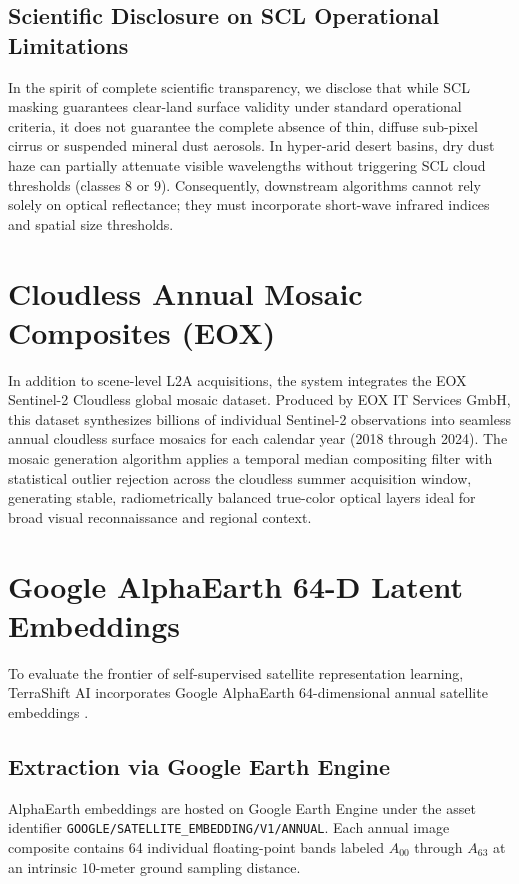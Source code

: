 \subsection{Scientific Disclosure on SCL Operational Limitations}
In the spirit of complete scientific transparency, we disclose that while SCL masking guarantees clear-land surface validity under standard operational criteria, it does not guarantee the complete absence of thin, diffuse sub-pixel cirrus or suspended mineral dust aerosols. In hyper-arid desert basins, dry dust haze can partially attenuate visible wavelengths without triggering SCL cloud thresholds (classes 8 or 9). Consequently, downstream algorithms cannot rely solely on optical reflectance; they must incorporate short-wave infrared indices and spatial size thresholds.

\section{Cloudless Annual Mosaic Composites (EOX)}
\label{sec:data_eox}
In addition to scene-level L2A acquisitions, the system integrates the EOX Sentinel-2 Cloudless global mosaic dataset. Produced by EOX IT Services GmbH, this dataset synthesizes billions of individual Sentinel-2 observations into seamless annual cloudless surface mosaics for each calendar year (2018 through 2024). The mosaic generation algorithm applies a temporal median compositing filter with statistical outlier rejection across the cloudless summer acquisition window, generating stable, radiometrically balanced true-color optical layers ideal for broad visual reconnaissance and regional context.

\section{Google AlphaEarth 64-D Latent Embeddings}
\label{sec:data_alphaearth}
To evaluate the frontier of self-supervised satellite representation learning, TerraShift AI incorporates Google AlphaEarth 64-dimensional annual satellite embeddings \citep{brown2025alphaearth}.

\subsection{Extraction via Google Earth Engine}
AlphaEarth embeddings are hosted on Google Earth Engine under the asset identifier \texttt{GOOGLE/SATELLITE\_EMBEDDING/V1/ANNUAL}. Each annual image composite contains 64 individual floating-point bands labeled $A_{00}$ through $A_{63}$ at an intrinsic $10\text{-meter}$ ground sampling distance.

